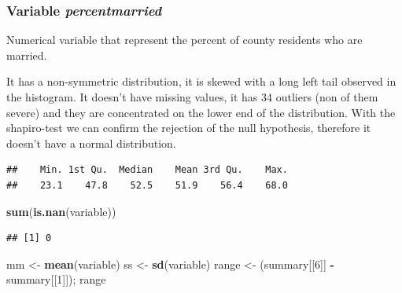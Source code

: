 \documentclass[
]{article}
\newenvironment{Shaded}{\begin{snugshade}}{\end{snugshade}}
\newcommand{\DecValTok}[1]{\textcolor[rgb]{0.00,0.00,0.81}{#1}}
\newcommand{\FunctionTok}[1]{\textcolor[rgb]{0.13,0.29,0.53}{\textbf{#1}}}
\newcommand{\NormalTok}[1]{#1}
\newcommand{\OtherTok}[1]{\textcolor[rgb]{0.56,0.35,0.01}{#1}}
\newcommand{\SpecialCharTok}[1]{\textcolor[rgb]{0.81,0.36,0.00}{\textbf{#1}}}
\begin{document}
\subsubsection{\texorpdfstring{Variable
\emph{percentmarried}}{Variable percentmarried}}\label{variable-percentmarried}

Numerical variable that represent the percent of county residents who
are married.

It has a non-symmetric distribution, it is skewed with a long left tail
observed in the histogram. It doesn't have missing values, it has 34
outliers (non of them severe) and they are concentrated on the lower end
of the distribution. With the shapiro-test we can confirm the rejection
of the null hypothesis, therefore it doesn't have a normal distribution.

\begin{Shaded}
\end{Shaded}

\begin{verbatim}
##    Min. 1st Qu.  Median    Mean 3rd Qu.    Max. 
##    23.1    47.8    52.5    51.9    56.4    68.0
\end{verbatim}

\begin{Shaded}
\begin{Highlighting}[]
\FunctionTok{sum}\NormalTok{(}\FunctionTok{is.nan}\NormalTok{(variable))}
\end{Highlighting}
\end{Shaded}

\begin{verbatim}
## [1] 0
\end{verbatim}

\begin{Shaded}
\begin{Highlighting}[]
\NormalTok{mm }\OtherTok{\textless{}{-}} \FunctionTok{mean}\NormalTok{(variable)}
\NormalTok{ss }\OtherTok{\textless{}{-}} \FunctionTok{sd}\NormalTok{(variable)}
\NormalTok{range }\OtherTok{\textless{}{-}}\NormalTok{ (summary[[}\DecValTok{6}\NormalTok{]] }\SpecialCharTok{{-}}\NormalTok{ summary[[}\DecValTok{1}\NormalTok{]]); range}
\end{Highlighting}
\end{Shaded}
\end{document}
